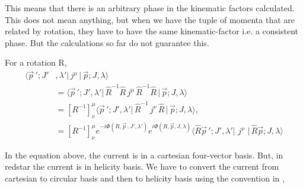 \documentclass[10pt]{article}
\begin{document}
This means that there is an arbitrary phase in the kinematic factors calculated. This does not mean anything, but when we have the tuple of momenta that are related by rotation, they have to have the same kinematic-factor i.e. a consistent phase. But the calculations so far do not guarantee this. \par
For a rotation R,
\begin{align*}
\big\langle \vec{p}\,'; J'& ,\lambda'  \big| \, j^\mu \, \big| \, \vec{p}; J, \lambda  \big\rangle  \\
 &= \big\langle \vec{p}\,'; J' ,\lambda' \big| \, \hat{R}^{-1}\hat{R} \, j^\mu \,  \hat{R}^{-1}\hat{R} \, \big| \, \vec{p}; J, \lambda  \big\rangle \\
&= \left[R^{-1}\right]^\mu_\nu    \big\langle \vec{p}\,'; J' ,\lambda'  \big|\,  \hat{R}^{-1} \, j^\nu\,  \hat{R} \, \big| \, \vec{p}; J, \lambda  \big\rangle,\\
&=  \left[R^{-1}\right]^\mu_\nu    e^{-i \Phi(R, \vec{p}\,, J', \lambda')} e^{i \Phi(R, \vec{p}, J, \lambda)} \big\langle \hat{R}\vec{p}\,'; J' ,\lambda'  \big|\,  \, j^\nu\,  \, \big| \, \hat{R}\vec{p}; J, \lambda  \big\rangle
\end{align*}
\iffalse{\color{blue} [to be deleted... ] \par When the current operator is also a helicity operator, it transforms the same way as that of a helicity state \cite{hel}. Thus, under a rotation R,
\begin{align}
\big\langle \vec{p}\,'; J'& ,\lambda'  \big| \, O_{J_\gamma}^{\dagger}(\vec{p}\,' - \vec{p},\lambda_{\gamma}) \, \big| \, \vec{p}; J, \lambda  \big\rangle  \\
 &=    e^{-i \Phi(R, \vec{p}\,, J', \lambda')} e^{i \Phi(R, \vec{p}, J, \lambda)} \big\langle \hat{R}\vec{p}\,'; J' ,\lambda'  \big|\,  \, \hat{R}^{-1} O_{J_\gamma}^{\dagger}(\vec{p}\,' - \vec{p},\lambda_{\gamma}) \hat{R} \,  \, \big| \, \hat{R}\vec{p}; J, \lambda  \big\rangle \\
&=    e^{-i \Phi(R, \vec{p}\,, J', \lambda')} e^{i \Phi(R, \vec{p}\,' - \vec{p}\,, J_{\gamma}, \lambda_{\gamma})}  e^{i \Phi(R, \vec{p}, J, \lambda)} \big\langle \hat{R}\vec{p}\,'; J' ,\lambda'  \big|\,  \, O_{J_\gamma}^{\dagger}(\hat{R}(\vec{p}\,' - \vec{p}),\lambda_{\gamma}) \,  \, \big| \, \hat{R}\vec{p}; J, \lambda  \big\rangle
\label{ph}
\end{align}
where the phase is defined by (Eq: \ref{hel_phase_D})}\fi \par
In the equation above, the current is in a cartesian four-vector basis. But, in redstar the current is in helicity basis. We have to convert the current from cartesian to circular basis and then to helicity basis using the convention in  \cite{hel},
\end{document}
